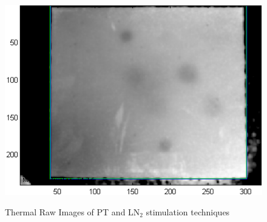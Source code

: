\documentclass[]{spie}  %
\begin{document}
\begin{figure}[ht]
{      \includegraphics[scale=0.5]{graph/Cool_Raw.png}
      \label{LN2_raw}
   }
   \caption{Thermal Raw Images of PT and LN$_2$ stimulation techniques}      
   \label{raw_results}
\end{figure}
\end{document}
